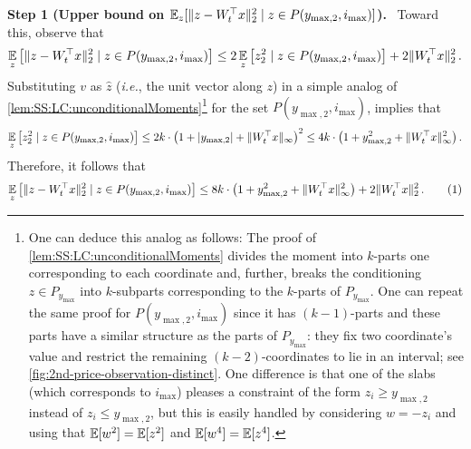\documentclass[11pt,letterpaper]{article}
\theoremstyle{plain}
\theoremstyle{definition}
\theoremstyle{remark}
\newcommand{\yesnum}{\addtocounter{equation}{1}\tag{\theequation}}
\def\abs#1{\left| #1 \right|}
\newcommand{\sinsquare}[1]{\ensuremath{[#1]}}
\newcommand{\inparen}[1]{\ensuremath{\left(#1\right)}}
\newcommand{\insquare}[1]{\ensuremath{\left[#1\right]}}
\newcommand{\snorm}[1]{\ensuremath{\ensuremath{\| #1 \|}}}
\let\norm\relax
\newcommand{\norm}[1]{\ensuremath{\left\lVert #1 \right\rVert}}
\newcommand{\E}{\operatornamewithlimits{\mathbb{E}}}
\newcommand{\Ex}{\E}
\newcommand{\wh}[1]{\widehat{#1}}
\renewcommand{\paragraph}[1]{\medskip \noindent\textbf{#1}~}
\newcommand{\ie}{\emph{i.e.}}
\newcommand{\ymax}{y_{\max}}
\newcommand{\smax}{\max,2} %
\newcommand{\imax}{i_{\max}}
\newcommand{\ysmax}{y_{\smax}}
\begin{document}
{{        \paragraph{Step 1 (Upper bound on $\Ex_z\sinsquare{
            \snorm{z - W_t^\top x}_2^2  \mid z\in P(\ysmax,\imax)
        }$).}
            Toward this, observe that 
            \[
                \Ex_z\insquare{
                    \snorm{z - W_t^\top x}_2^2  \mid z\in P(\ysmax,\imax)
                }
                \leq 
                2 \Ex_z\insquare{
                    \norm{z}_2^2 \mid z\in P(\ysmax,\imax)
                }
                + 2 \snorm{W_t^\top x}_2^2  \,.
            \]
            Substituting $v$ as $\wh{z}$ (\ie{}, the unit vector along $z$) in a simple analog of  \cref{lem:SS:LC:unconditionalMoments}\footnote{One can deduce this analog as follows: The proof of \cref{lem:SS:LC:unconditionalMoments} divides the moment into $k$-parts one corresponding to each coordinate and, further, breaks the conditioning $z\in P_{\ymax}$ into $k$-subparts corresponding to the $k$-parts of $P_{\ymax}$. One can repeat the same proof for $P(\ysmax,\imax)$ since it has $(k-1)$-parts and these parts have a similar structure as the parts of $P_{\ymax}$: they fix two coordinate's value and restrict the remaining $(k-2)$-coordinates to lie in an interval; see \cref{fig:2nd-price-observation-distinct}. One difference is that one of the slabs (which corresponds to $\imax$) pleases a constraint of the form $z_i\geq \ysmax$ instead of $z_i\leq \ysmax$, but this is easily handled by considering $w=-z_i$ and using that $\Ex[w^2]=\Ex[z^2]$ and $\Ex[w^4]=\Ex[z^4]$.\label{footnote:secondPriceBounds}} for the set $P(\ysmax,\imax)$, implies that 
            \[
                \Ex_z\insquare{
                    \norm{z}_2^2 \mid z\in P(\ysmax,\imax)
                }\leq 
                    2k\cdot 
                    {
                    \inparen{
                        1
                        +\abs{\ysmax}
                        +\snorm{W_t^\top x}_\infty
                    }^2
                    }
                    \leq 
                    4k\cdot 
                    {
                    \inparen{
                        1
                        +\ysmax^2
                        +\snorm{W_t^\top x}^2_\infty
                    }
                    }\,.
            \]
            Therefore, it follows that 
            \[
                \Ex_z\insquare{
                    \snorm{z - W_t^\top x}_2^2  \mid z\in P(\ysmax,\imax)
                }
                \leq 
                8k\cdot {
                    \inparen{
                        1
                        +\ysmax^2
                        +\snorm{W_t^\top x}^2_\infty
                    }
                 }
                + 2 \snorm{W_t^\top x}_2^2  \,.
                \yesnum\label{eq:2ndPrice:secondMoment:ub1}
            \]

}}
\end{document}
